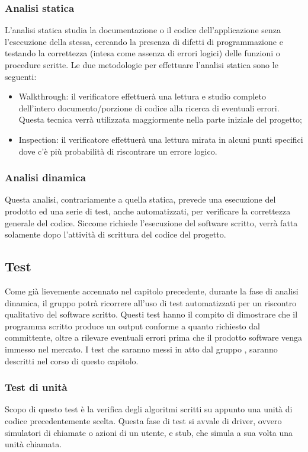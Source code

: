 \subsubsection{Analisi statica}
L’analisi statica studia la documentazione o il codice dell’applicazione senza l’esecuzione della stessa, cercando la presenza di difetti di programmazione e testando la correttezza (intesa come assenza di errori logici) delle funzioni o procedure scritte.
Le due metodologie per effettuare l’analisi statica sono le seguenti:
\begin{itemize}
	\item Walkthrough: il verificatore effettuerà una lettura e studio completo dell’intero documento/porzione di codice alla ricerca di eventuali errori. Questa tecnica verrà utilizzata maggiormente nella parte iniziale del progetto;
	\item Inspection: il verificatore effettuerà una lettura mirata in alcuni punti specifici dove c’è più probabilità di riscontrare un errore logico.
\end{itemize}

\subsubsection{Analisi dinamica}
Questa analisi, contrariamente a quella statica, prevede una esecuzione del prodotto ed una serie di test, anche automatizzati, per verificare la correttezza generale del codice. Siccome richiede l’esecuzione del software scritto, verrà fatta solamente dopo l’attività di scrittura del codice del progetto.

\subsection{Test}
Come già lievemente accennato nel capitolo precedente, durante la fase di analisi dinamica, il gruppo {\Gruppo} potrà ricorrere all’uso di test automatizzati per un riscontro qualitativo del software scritto. Questi test hanno il compito di dimostrare che il programma scritto produce un output conforme a quanto richiesto dal committente, oltre a rilevare eventuali errori prima che il prodotto software venga immesso nel mercato. I test che saranno messi in atto dal gruppo {\Gruppo}, saranno descritti nel corso di questo capitolo.

\subsubsection{Test di unità}
Scopo di questo test è la verifica degli algoritmi scritti su appunto una unità di codice precedentemente scelta. Questa fase di test si avvale di driver, ovvero simulatori di chiamate o azioni di un utente, e stub, che simula a sua volta una unità chiamata.

